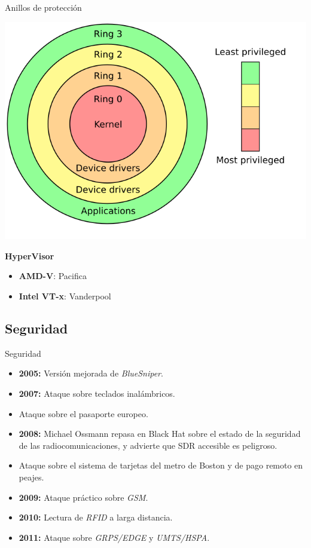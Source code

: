 \documentclass{beamer}
\begin{document}
\begin{frame}{Anillos de protección}
 \begin{center}
\includegraphics[scale=0.35]{Priv_rings.png}
\end{center}
\textbf{HyperVisor}
\begin{itemize}
\item \textbf{AMD-V}: Pacifica
\item \textbf{Intel VT-x}: Vanderpool
\end{itemize}
\end{frame}

\subsection{Seguridad}

\begin{frame}{Seguridad}

\begin{itemize}
	\item \textbf{2005:} Versión mejorada de \emph{BlueSniper}.
	\item \textbf{2007:} Ataque sobre teclados inalámbricos.
	\item Ataque sobre el pasaporte europeo.
	\item \textbf{2008:} Michael Ossmann repasa en Black Hat sobre el estado de la seguridad de las radiocomunicaciones, y advierte que SDR accesible es peligroso.
	\item Ataque sobre el sistema de tarjetas del metro de Boston y de pago remoto en peajes.
	\item \textbf{2009:} Ataque práctico sobre \emph{GSM}.
	\item \textbf{2010:} Lectura de \emph{RFID} a larga distancia.
	\item \textbf{2011:} Ataque sobre \emph{GRPS/EDGE} y \emph{UMTS/HSPA}.
\end{itemize}

\end{frame}
\end{document}
